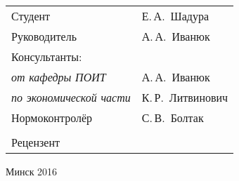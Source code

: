 \begin{titlepage}
\begin{center}
    \begin{tabular}{ p{}p{} }
      Студент & Е.\,А.~Шадура \\
      Руководитель & А.\,А.~Иванюк \\
      Консультанты: &\\
      \hspace*{3ex}\emph{от кафедры ПОИТ} & А.\,А.~Иванюк \\
      \hspace*{3ex}\emph{по экономической части} & К.\,Р.~Литвинович \\
      Нормоконтролёр & С.\,В.~Болтак \\
      & \\
      Рецензент &
    \end{tabular}

    \vfill
    {\normalsize Минск 2016}
  \end{center}
\end{titlepage}
